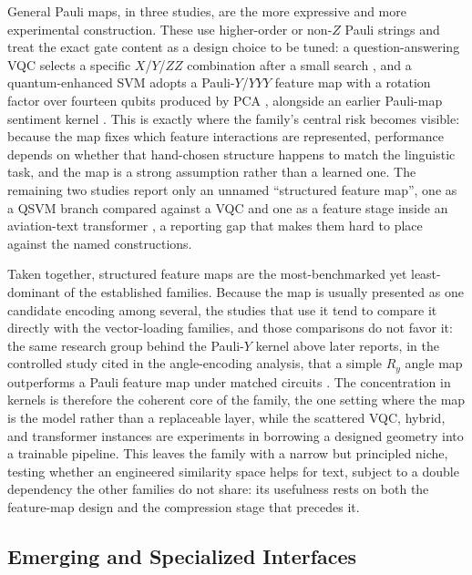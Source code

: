 \documentclass{ieeeaccess}
\begin{document}
General Pauli maps, in three studies, are the more expressive and more experimental construction. These use higher-order or non-$Z$ Pauli strings and treat the exact gate content as a design choice to be tuned: a question-answering VQC selects a specific $X$/$Y$/$ZZ$ combination after a small search \cite{katyayan_supervised_2023}, and a quantum-enhanced SVM adopts a Pauli-$Y$/$YYY$ feature map with a rotation factor over fourteen qubits produced by PCA \cite{ruskanda_quantum-enhanced_2023}, alongside an earlier Pauli-map sentiment kernel \cite{mohammad_masum_hybrid_2023}. This is exactly where the family's central risk becomes visible: because the map fixes which feature interactions are represented, performance depends on whether that hand-chosen structure happens to match the linguistic task, and the map is a strong assumption rather than a learned one. The remaining two studies report only an unnamed ``structured feature map'', one as a QSVM branch compared against a VQC \cite{sunkavalli_experimentation_2024} and one as a feature stage inside an aviation-text transformer \cite{jagatheesan_quantum_2026}, a reporting gap that makes them hard to place against the named constructions.

Taken together, structured feature maps are the most-benchmarked yet least-dominant of the established families. Because the map is usually presented as one candidate encoding among several, the studies that use it tend to compare it directly with the vector-loading families, and those comparisons do not favor it: the same research group behind the Pauli-$Y$ kernel above later reports, in the controlled study cited in the angle-encoding analysis, that a simple $R_y$ angle map outperforms a Pauli feature map under matched circuits \cite{ruskanda_evaluating_2025}. The concentration in kernels is therefore the coherent core of the family, the one setting where the map is the model rather than a replaceable layer, while the scattered VQC, hybrid, and transformer instances are experiments in borrowing a designed geometry into a trainable pipeline. This leaves the family with a narrow but principled niche, testing whether an engineered similarity space helps for text, subject to a double dependency the other families do not share: its usefulness rests on both the feature-map design and the compression stage that precedes it.

\subsection{Emerging and Specialized Interfaces}
\label{subsec:emerging_specialized_interfaces}
\end{document}

